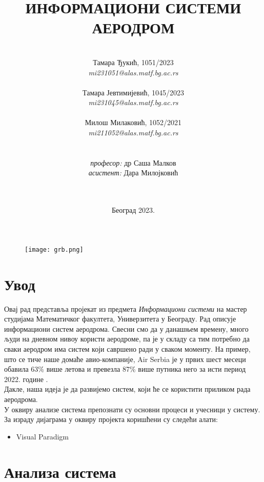 \documentclass{article}
\title{\textbf{ИНФОРМАЦИОНИ СИСТЕМИ} \\
\vspace{10}
\Large{\textbf{АЕРОДРОМ}}}
\author{\\Тамара Ђукић, 1051/2023 \\ \textit{mi231051@alas.matf.bg.ac.rs} \\\\
        Тамара Јевтимијевић, 1045/2023 \\ \textit{mi231045@alas.matf.bg.ac.rs} \\\\
        Милош Милаковић, 1052/2021 \\ \textit{mi211052@alas.matf.bg.ac.rs} \\\\\\
        \textit{професор:} др Саша Малков \\
        \textit{асистент:} Дара Милојковић \\\\\\}
\date{Београд 2023.}
\begin{document}
\maketitle
\thispagestyle{empty} 

\vspace{17}
\begin{figure}[h!]
    \centering
    \texttt{[image: grb.png]}
\end{figure} 

\newpage
\tableofcontents

\newpage
\section{Увод}
Овај рад представља пројекат из предмета \textit{Информациони системи} на мастер студијама Математичког факултета, Универзитета у Београду. Рад описује информациони систем аеродрома. 
 Свесни смо да у данашњем времену, много људи на дневном нивоу користи аеродроме, па је у складу са тим потребно да сваки аеродром има систем који савршено ради у сваком моменту. На пример, што се тиче наше домаће авио-компаније, Air Serbia је у првих шест месеци обавила 63\% више летова и превезла 87\% више путника него за исти период 2022. године \cite{bbc_srbija}. \\ 
 Дакле, наша идеја је да развијемо систем, који ће се користити приликом рада аеродрома.\\
У оквиру анализе система препознати су основни процеси и учесници у систему. За израду дијаграма у оквиру пројекта коришћени су следећи алати:
\begin{itemize}
    \item Visual Paradigm
\end{itemize}

\section{Анализа система}
\end{document}
